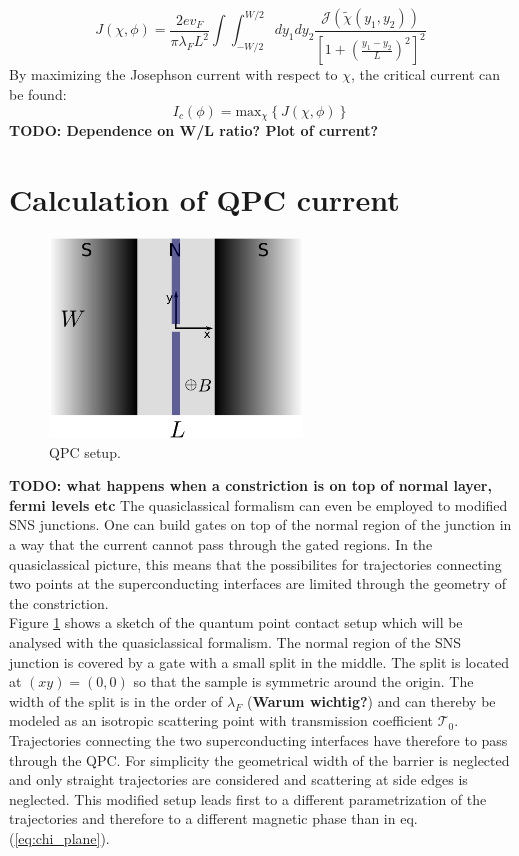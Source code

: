 \begin{equation}
J\left(\chi, \phi \right) = \frac{2 e v_F}{\pi \lambda_F L^2}  \int \int_{-W/2}^{W/2} d y_1 d y_2 \frac{\mathcal{J}(\tilde{\chi}(y_1, y_2))}{\left[ 1 + \left(\frac{y_1 - y_2}{L}\right)^2\right]^2}
\label{eq:josephson_current}
\end{equation}
By maximizing the Josephson current with respect to $\chi$, the critical current can be found:
\begin{equation}
I_c(\phi) = \text{max}_{\chi}\left\{ J(\chi, \phi) \right\}
\end{equation}
\textbf{TODO: Dependence on W/L ratio? Plot of current?}

\section{Calculation of QPC current}
\begin{figure}
\centering
\includegraphics[width=0.6\textwidth]{figure/analyticalmodel/qpc_sns_junction}
\caption{QPC setup.}
\label{fig:qpc_sns_schematic}
\end{figure}
\textbf{TODO: what happens when a constriction is on top of normal layer, fermi levels etc}
The quasiclassical formalism can even be employed to modified SNS junctions. One can build gates on top of the normal region of the junction in a way that the current cannot pass through the gated regions. In the quasiclassical picture, this means that the possibilites for trajectories connecting two points at the superconducting interfaces are limited through the geometry of the constriction.\\
Figure \ref{fig:qpc_sns_schematic} shows a sketch of the quantum point contact setup which will be analysed with the quasiclassical formalism. The normal region of the SNS junction is covered by a gate with a small split in the middle. The split is located at $(x y) = (0, 0)$ so that the sample is symmetric around the origin. The width of the split is in the order of $\lambda_F$ (\textbf{Warum wichtig?}) and can thereby be modeled as an isotropic scattering point with transmission coefficient $\mathcal{T}_0$. Trajectories connecting the two superconducting interfaces have therefore to pass through the QPC. For simplicity the geometrical width of the barrier is neglected and only straight trajectories are considered and scattering at side edges is neglected. This modified setup leads first to a different parametrization of the trajectories and therefore to a different magnetic phase than in eq. (\ref{eq:chi_plane}).\\
